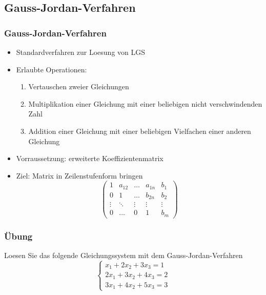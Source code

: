 \subsection{Gauss-Jordan-Verfahren}
\begin{frame}
    \frametitle{Gauss-Jordan-Verfahren}
    \begin{itemize}
        \item Standardverfahren zur Loesung von LGS
        \item Erlaubte Operationen:
        \begin{enumerate}
            \item Vertauschen zweier Gleichungen
            \item Multiplikation einer Gleichung mit einer beliebigen nicht verschwindenden Zahl
            \item Addition einer Gleichung mit einer beliebigen Vielfachen einer anderen Gleichung
        \end{enumerate}
        \item Vorraussetzung: erweiterte Koeffizientenmatrix
        \item Ziel: Matrix in Zeilenstufenform bringen
        \begin{equation*}
            \begin{pmatrix}
                1      & a_{12} & \dots  & a_{1n} & b_1    \\
                0      & 1      & \dots  & b_{2n} & b_2    \\
                \vdots & \ddots & \vdots & \vdots & \vdots \\
                0      & \dots  & 0      & 1      & b_m
            \end{pmatrix}
        \end{equation*}
    \end{itemize}
\end{frame}

\begin{frame}
    \frametitle{Übung}
    Loesen Sie das folgende Gleichungssystem mit dem Gauss-Jordan-Verfahren
    \begin{equation*}
        \begin{cases}
            x_1 + 2x_2 + 3x_3 = 1 \\
            2x_1 + 3x_2 + 4x_3 = 2 \\
            3x_1 + 4x_2 + 5x_3 = 3
        \end{cases}
    \end{equation*}
\end{frame}


